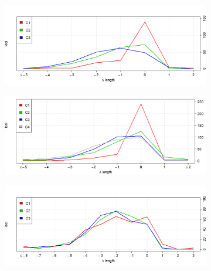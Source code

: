 \begin{figure}[htp]
	\centering
	\begin{subfigure}{0.49\textwidth}
		\includegraphics[width=\linewidth,keepaspectratio]{images/msiclones/patient1_median_shift}
		\caption{}\label{fig:msiclones:median_shift_1}
	\end{subfigure}%
	\hfill%
	\begin{subfigure}{0.49\textwidth}
		\includegraphics[width=\linewidth,keepaspectratio]{images/msiclones/patient2_median_shift}
		\caption{}\label{fig:msiclones:median_shift_2}
	\end{subfigure}
	\par
	\begin{subfigure}{0.49\textwidth}
		\includegraphics[width=\linewidth,keepaspectratio]{images/msiclones/patient3_median_shift}
		\caption{}\label{fig:msiclones:median_shift_3}
	\end{subfigure}%
	\hfill%
	\begin{subfigure}{0.49\textwidth}

\end{subfigure}
\end{figure}
